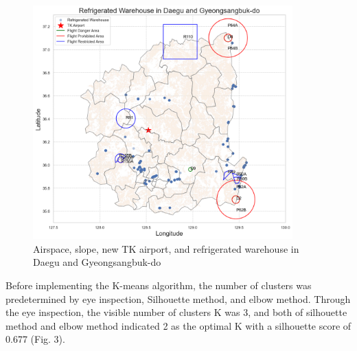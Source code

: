 \documentclass[11pt]{article}
\begin{document}
    \begin{figure}[H]
        \centering
        \includegraphics[width = 10cm]{./figure/basic.png}
        \caption{Airspace, slope, new TK airport, and refrigerated warehouse in Daegu and Gyeongsangbuk-do}
        \label{fig:enter-label}
    \end{figure}
    
    Before implementing the K-means algorithm, the number of clusters was predetermined by eye inspection, Silhouette method, and elbow method. Through the eye inspection, the visible number of clusters K was 3, and both of silhouette method and elbow method indicated 2 as the optimal K with a silhouette score of 0.677 (Fig. 3).
    
\end{document}
